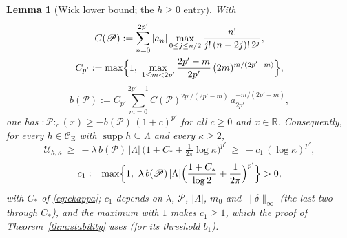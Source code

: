 \documentclass[11pt,a4paper]{article}
\theoremstyle{plain}
\newtheorem{lemma}[theorem]{Lemma}
\theoremstyle{definition}
\theoremstyle{plain}
\theoremstyle{definition}
\newcommand{\R}{\mathbb{R}}
\newcommand{\CE}{\mathcal{C}_{\mathrm E}}
\DeclareMathOperator{\supp}{supp}
\begin{document}
\begin{lemma}[Wick lower bound; the $h\ge0$ entry]\label{lem:wick}
With
\begin{gather*}
 C(\mathscr P):=\sum_{n=0}^{2p'}|a_n|\max_{0\le j\le n/2}\frac{n!}{j!\,(n-2j)!\,2^j},\\
 C_{p'}:=\max\Bigl\{1,\ \max_{1\le m<2p'}\frac{2p'-m}{2p'}\,(2m)^{m/(2p'-m)}\Bigr\},
\end{gather*}
\[
 b(\mathscr P):=C_{p'}\sum_{m=0}^{2p'-1}C(\mathscr P)^{2p'/(2p'-m)}\,a_{2p'}^{-m/(2p'-m)} ,
\]
one has ${:}\mathscr P{:}_c(x)\ge-b(\mathscr P)\,(1+c)^{p'}$ for all $c\ge0$ and $x\in\R$.
Consequently, for every $h\in\CE$ with $\supp h\subseteq\Lambda$ and every $\kappa\ge2$,
\[
  \mathcal U_{h,\kappa}\ \ge\
  -\lambda\,b(\mathscr P)\,|\Lambda|\,\bigl(1+C_*+\tfrac1{2\pi}\log\kappa\bigr)^{p'}
  \ \ge\ -c_1\,(\log\kappa)^{p'},
\]
\[
  c_1:=\max\Bigl\{1,\ \lambda\,b(\mathscr P)\,|\Lambda|\Bigl(\frac{1+C_*}{\log2}+\frac1{2\pi}
  \Bigr)^{p'}\Bigr\}>0 ,
\]
with $C_*$ of \eqref{eq:ckappa}; $c_1$ depends on $\lambda$, $\mathscr P$, $|\Lambda|$, $m_0$
and $\|\delta\|_\infty$ (the last two through $C_*$), and the maximum with $1$ makes
$c_1\ge1$, which the proof of Theorem~\ref{thm:stability} uses (for its threshold $b_1$).
\end{lemma}
\end{document}
